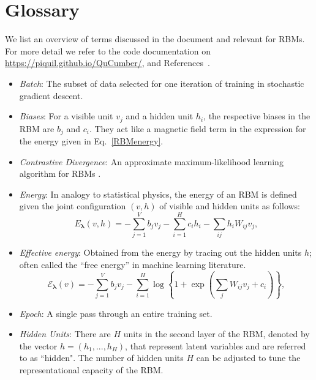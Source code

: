 \documentclass[submission, Phys]{SciPost}
\begin{document}
\appendix
\section{Glossary}
\label{Glossary}

We list an overview of terms discussed in the document and relevant for RBMs. For more detail we refer to the code documentation on \url{https://piquil.github.io/QuCumber/}, and References~\cite{hinton2002training, hinton2012practical}.

\begin{itemize}

	\item {\it Batch}: The subset of data selected for one iteration of training in stochastic gradient descent.

	\item {\it Biases}: For a visible unit $v_j$ and a hidden unit $h_i$, the respective biases in the RBM are $b_j$ and $c_i$. They act like a magnetic field term in the expression for the energy given in Eq.~\eqref{RBMenergy}.

	\item {\it Contrastive Divergence}: An approximate maximum-likelihood learning algorithm for RBMs \cite{hinton2002training}.

	\item {\it Energy}: In analogy to statistical physics, the energy of an RBM is defined given the joint configuration $(v,h)$ of visible and hidden units as follows:
	      \begin{equation}
		      E_{\bm{\lambda}}(v,h) = - \sum\limits_{j=1}^V b_j v_j - \sum\limits_{i=1}^H c_i h_i - \sum\limits_{ij} h_i W_{ij} v_j, \label{RBMenergy}
	      \end{equation}

	\item {\it Effective energy}: Obtained from the energy by tracing out the hidden units $h$; often called the ``free energy'' in machine learning literature.
	      \begin{equation}
		      \mathcal{E}_{\bm{\lambda}}(v) = - \sum\limits_{j=1}^V b_j v_j - \sum\limits_{i=1}^H \log \left\{ 1 + \exp \left( \sum\limits_{j} W_{ij}v_j +c_i\right) \right\}, \label{RBMeffectiveenergy}
	      \end{equation}

	\item {\it Epoch}: A single pass through an entire training set.

	\item {\it Hidden Units}: There are $H$ units in the second layer of the RBM, denoted by the vector $h=(h_1, ..., h_H)$, that represent latent variables and are referred to as ``hidden". The number of hidden units $H$ can be adjusted to tune the representational capacity of the RBM.


\end{itemize}
\end{document}

